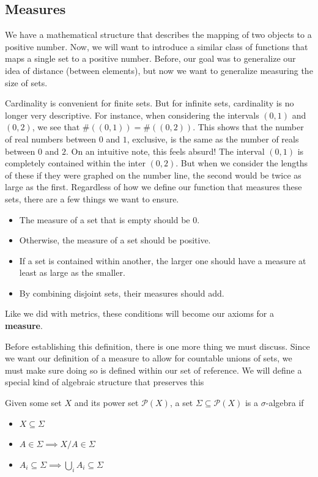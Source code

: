 \subsection{Measures}

We have a mathematical structure that describes the mapping of two objects to a positive number. Now, we will want to introduce a similar class of functions that maps a single set to a positive number. Before, our goal was to generalize our idea of distance (between elements), but now we want to generalize measuring the size of sets. 

Cardinality is convenient for finite sets. But for infinite sets, cardinality is no longer very descriptive. For instance, when considering the intervals $(0,1)$ and $(0,2)$, we see that $\#((0,1))=\#((0,2))$. This shows that the number of real numbers between $0$ and $1$, exclusive, is the same as the number of reals between $0$ and $2$. On an intuitive note, this feels absurd! The interval $(0,1)$ is completely contained within the inter $(0,2)$. But when we consider the lengths of these if they were graphed on the number line, the second would be twice as large as the first. Regardless of how we define our function that measures these sets, there are a few things we want to ensure. 

\begin{itemize}
    \item The measure of a set that is empty should be $0$.
    \item Otherwise, the measure of a set should be positive.
    \item If a set is contained within another, the larger one should have a measure at least as large as the smaller.
    \item By combining disjoint sets, their measures should add.
\end{itemize}

Like we did with metrics, these conditions will become our axioms for a \textbf{measure}.

Before establishing this definition, there is one more thing we must discuss. Since we want our definition of a measure to allow for countable unions of sets, we must make sure doing so is defined within our set of reference. We will define a special kind of algebraic structure that preserves this

\begin{definition}
    Given some set $X$ and its power set $\mathcal{P}(X)$, a set $\Sigma\subseteq \mathcal{P}(X)$ is a $\sigma$-algebra if
        \begin{itemize}
            \item $X \subseteq \Sigma$
            \item $A\in\Sigma \implies X / A\in\Sigma$
            \item $A_i\subseteq\Sigma \implies \bigcup_i A_i\subseteq \Sigma$
        \end{itemize}
\end{definition} 

